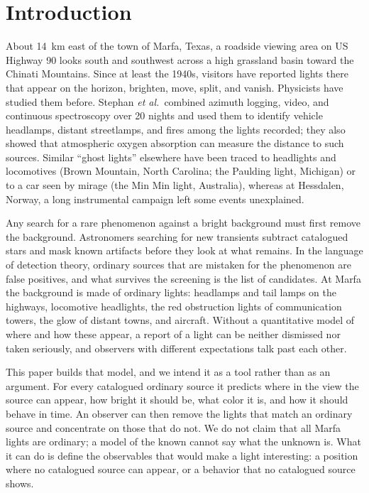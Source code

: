 \documentclass[aip,jap,amsmath,amssymb,reprint,floatfix]{revtex4-2}
\begin{document}
\section{Introduction}

About 14~km east of the town of Marfa, Texas, a roadside viewing area on US Highway 90 looks south and southwest across a high grassland basin toward the Chinati Mountains. Since at least the 1940s, visitors have reported lights there that appear on the horizon, brighten, move, split, and vanish.\cite{Smith2017,Hall2006} Physicists have studied them before. Stephan \textit{et al.}\ combined azimuth logging, video, and continuous spectroscopy over 20 nights and used them to identify vehicle headlamps, distant streetlamps, and fires among the lights recorded; they also showed that atmospheric oxygen absorption can measure the distance to such sources.\cite{Stephan2009} Similar ``ghost lights'' elsewhere have been traced to headlights and locomotives (Brown Mountain, North Carolina;\cite{Mansfield1971} the Paulding light, Michigan\cite{MTU2010}) or to a car seen by mirage (the Min Min light, Australia\cite{Pettigrew2003}), whereas at Hessdalen, Norway, a long instrumental campaign left some events unexplained.\cite{Caron2016}

Any search for a rare phenomenon against a bright background must first remove the background. Astronomers searching for new transients subtract catalogued stars and mask known artifacts before they look at what remains. In the language of detection theory, ordinary sources that are mistaken for the phenomenon are false positives, and what survives the screening is the list of candidates. At Marfa the background is made of ordinary lights: headlamps and tail lamps on the highways, locomotive headlights, the red obstruction lights of communication towers, the glow of distant towns, and aircraft. Without a quantitative model of where and how these appear, a report of a light can be neither dismissed nor taken seriously, and observers with different expectations talk past each other.

This paper builds that model, and we intend it as a tool rather than as an argument. For every catalogued ordinary source it predicts where in the view the source can appear, how bright it should be, what color it is, and how it should behave in time. An observer can then remove the lights that match an ordinary source and concentrate on those that do not. We do not claim that all Marfa lights are ordinary; a model of the known cannot say what the unknown is. What it can do is define the observables that would make a light interesting: a position where no catalogued source can appear, or a behavior that no catalogued source shows.
\end{document}
